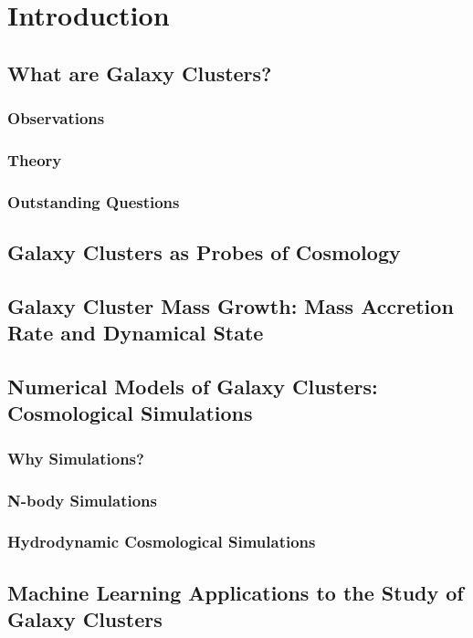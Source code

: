 \chapter{Introduction} \label{chap:chap-1}


\section{What are Galaxy Clusters?}
\subsection{Observations}
\subsection{Theory}
\subsection{Outstanding Questions}
\section{Galaxy Clusters as Probes of Cosmology}
\section{Galaxy Cluster Mass Growth: Mass Accretion Rate and Dynamical State}
\section{Numerical Models of Galaxy Clusters: Cosmological Simulations}
\subsection{Why Simulations?}
\subsection{N-body Simulations}
\subsection{Hydrodynamic Cosmological Simulations}
\section{Machine Learning Applications to the Study of Galaxy Clusters}
